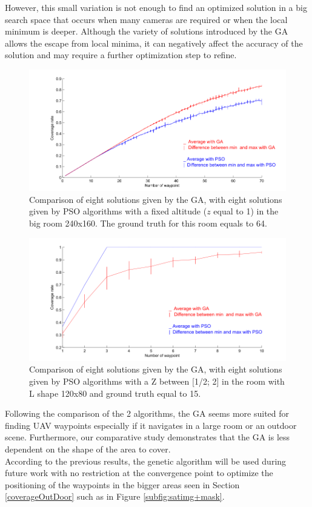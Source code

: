 However, this small variation is not enough to find an optimized solution in a big search space that occurs when many cameras are required or when the local minimum is deeper.
Although the variety of solutions introduced by the GA allows the escape from local minima, it can negatively affect the accuracy of the solution and may require a further optimization step to refine. 

\begin{figure}
  \includegraphics[width=\linewidth]{img/fig8.png}
  \caption{ Comparison of eight solutions given by the GA, with eight solutions given by PSO algorithms with a fixed altitude ($z$ equal to 1) in the big room 240x160. The ground truth for this room equals to 64.}\label{fig:bigRz1}
   \endminipage\hfill
\end{figure}
%
%
\begin{figure}
  \includegraphics[width=\linewidth]{img/fig9.png}
  \caption{Comparison of eight solutions given by the GA, with eight solutions given by PSO algorithms with a Z between [1/2; 2] in the room with L shape 120x80 and ground truth equal to 15.}\label{fig:RLz2}
   \endminipage\hfill
\end{figure}

 Following the comparison of the 2 algorithms, the GA seems more suited for finding UAV waypoints especially if it navigates in a large room or an outdoor scene.
Furthermore, our comparative study demonstrates that the GA is less dependent on the shape of the area to cover. \\
According to the previous results, the genetic algorithm will be used during future work with no restriction at the convergence point to optimize the positioning of the waypoints in the bigger areas seen in Section  \ref{coverageOutDoor} such as in Figure \ref{subfig:satimg+mask}.\\


